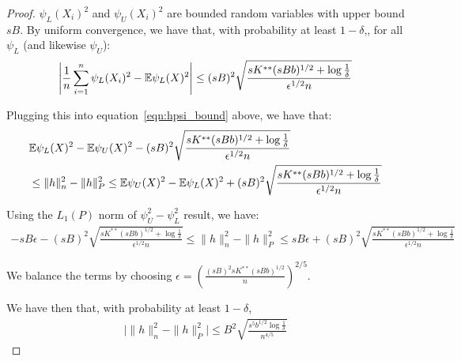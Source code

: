 \begin{proof}
$\psi_L(X_i)^2$ and $\psi_U(X_i)^2$ are bounded random variables with upper bound $sB$. By uniform convergence, we have that, with probability at least $1-\delta$,, for all $\psi_L$ (and likewise $\psi_U$):
\[
\left| \frac{1}{n} \sum_{i=1}^n \psi_L(X_i)^2 - 
   {\mathbb E} \psi_L(X)^2 \right| \leq (sB)^2 \sqrt{ \frac{ sK^{**} (sBb)^{1/2} + \log \frac{1}{\delta}}{ \epsilon^{1/2} n} }
\]

Plugging this into equation~\ref{eqn:hpsi_bound} above, we have that:
\begin{align*}
& {\mathbb E} \psi_L(X)^2 - {\mathbb E} \psi_U(X)^2 - 
(sB)^2 \sqrt{ \frac{ sK^{**} (sBb)^{1/2} + \log \frac{1}{\delta}}{ \epsilon^{1/2} n} } \\
 & \leq 
 \| h \|_n^2 - \| h \|_P^2 \leq
{\mathbb E} \psi_U(X)^2 - {\mathbb E} \psi_L(X)^2 + 
(sB)^2 \sqrt{ \frac{ sK^{**} (sBb)^{1/2} + \log \frac{1}{\delta}}{ \epsilon^{1/2} n} }
\end{align*}

Using the $L_1(P)$ norm of $\psi_U^2 - \psi_L^2$ result, we have:
\begin{align*}
-sB\epsilon - 
(sB)^2 \sqrt{ \frac{ sK^{**} (sBb)^{1/2} + \log \frac{1}{\delta}}{ \epsilon^{1/2} n} } \leq 
 \| h \|_n^2 - \| h \|_P^2 \leq
sB\epsilon + 
(sB)^2 \sqrt{ \frac{ sK^{**} (sBb)^{1/2} + \log \frac{1}{\delta}}{ \epsilon^{1/2} n} }
\end{align*}

We balance the terms by choosing $\epsilon = \left( \frac{ (sB)^2 sK^{**} (sBb)^{1/2}}{n} \right)^{2/5}$.

We have then that, with probability at least $1-\delta$,
\begin{align*}
\big| \| h \|_n^2 - \| h \|_P^2  \big| \leq
  B^2 \sqrt{ \frac{s^5 b^{1/2} \log \frac{1}{\delta}}{n^{4/5}}}
\end{align*}





\end{proof}
